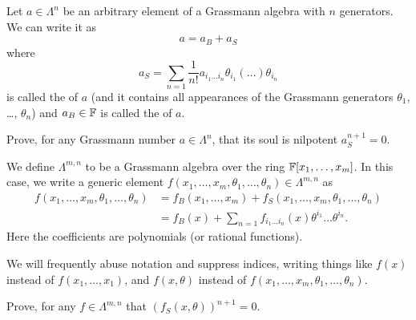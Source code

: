\begin{definition}
Let $a\in\Lambda^{n}$ be an arbitrary element of a Grassmann algebra
with $n$ generators. We can write it as
\begin{equation}
a = a_{B} + a_{S}
\end{equation}
where
\begin{equation}
a_{S} = \sum_{n=1}\frac{1}{n!}a_{i_{1}\dots i_{n}}\theta_{i_{1}}(\dots)\theta_{i_{n}}
\end{equation}
is called the  of $a$ (and it contains all appearances of the
Grassmann generators $\theta_{1}$, \dots, $\theta_{n}$) and
$a_{B}\in\mathbb{F}$ is called the  of $a$.
\end{definition}

\begin{exercise}
Prove, for any Grassmann number $a\in\Lambda^{n}$, that its soul is nilpotent $a_{S}^{n+1}=0$.
\end{exercise}

\begin{definition}
We define $\Lambda^{m,n}$ to be a Grassmann algebra over the ring
$\mathbb{F}[x_{1},\dots,x_{m}]$. In this case, we write a generic element
$f(x_{1},\dots,x_{m},\theta_{1},\dots,\theta_{n})\in\Lambda^{m,n}$ as
\begin{equation}
  \begin{split}
  f(x_{1},\dots,x_{m},\theta_{1},\dots,\theta_{n})
&= f_{B}(x_{1},\dots,x_{m}) + f_{S}(x_{1},\dots,x_{m},\theta_{1},\dots,\theta_{n})\\
&= f_{B}(x) + \sum_{n=1}f_{i_{1}\dots i_{n}}(x)\theta^{i_{1}}\dots\theta^{i_{n}}.
  \end{split}
\end{equation}
Here the coefficients are polynomials (or rational functions).
\end{definition}

\begin{remark}
We will frequently abuse notation and suppress indices, writing things
like $f(x)$ instead of $f(x_{1},\dots,x_{1})$, and $f(x,\theta)$ instead
of $f(x_{1},\dots,x_{m},\theta_{1},\dots,\theta_{n})$.
\end{remark}

\begin{exercise}
Prove, for any $f\in\Lambda^{m,n}$ that $(f_{S}(x,\theta))^{n+1}=0$.
\end{exercise}

